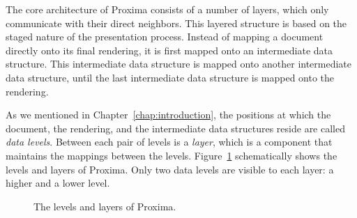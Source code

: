 \documentclass{speauth}
\begin{document}
The core architecture of Proxima consists of a number of layers, which only communicate with their direct neighbors. This layered structure is based on the staged nature of the presentation process. Instead of mapping a document directly onto its final rendering, it is first mapped onto an intermediate data structure. This intermediate data structure is mapped onto another intermediate data structure, until the last intermediate data structure is mapped onto the rendering.

As we mentioned in Chapter~\ref{chap:introduction}, the positions at which the document, the rendering, and the intermediate data structures reside are called {\em data levels}. Between each pair of levels is a {\em layer}, which is a component that maintains the mappings between the levels. Figure~\ref{proxlayers} schematically shows the levels and layers of Proxima. Only two data levels are visible to each layer: a higher and a lower level.

\begin{figure}
\begin{center}
\begin{center}
\end{center}
\caption{The levels and layers of Proxima.}\label{proxlayers} 
\end{center}
\end{figure}
\end{document}
